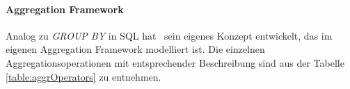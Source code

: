 \paragraph{Aggregation Framework}\label{aggrFr}

Analog zu \textit{GROUP BY} in SQL hat \mongo\ sein eigenes Konzept entwickelt, das im eigenen Aggregation Framework modelliert ist. Die einzelnen Aggregationsoperationen mit entsprechender Beschreibung sind aus der Tabelle \ref{table:aggrOperators} zu entnehmen. %

\newcommand*{\head}[1]{\textbf{#1}}%


